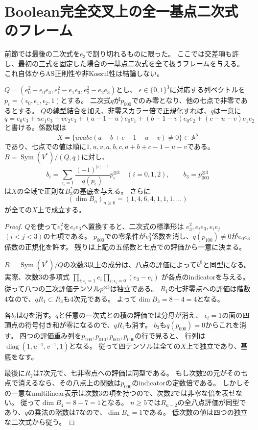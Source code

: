 \section{Boolean完全交叉上の全一基点二次式のフレーム}
\label{sec:boolean-quadric-boundary}
前節では最後の二次式を$e_3$で割り切れるものに限った。
ここでは交差項も許し、最初の三式を固定した場合の一基点二次式を全て扱うフレームを与える。
これ自体からAS正則性や非Koszul性は結論しない。

\begin{proposition}[全一基点開集合での三次評価フレーム]
\label{prop:boolean-global-cubic-frame}
$Q=(e_0^2-e_0e_3,e_1^2-e_1e_3,e_2^2-e_2e_3)$とし、
$\epsilon\in\{0,1\}^3$に対応する列ベクトルを$p_\epsilon=(\epsilon_0,\epsilon_1,\epsilon_2,1)$とする。
二次式$q$が$p_{000}$でのみ零となり、他の七点で非零であるとする。
$Q$の線型結合を加え、非零スカラー倍で正規化すれば、$q$は一意に
\[
 q=e_0e_3+u e_1e_3+v e_2e_3
 +(a-1-u)e_0e_1+(b-1-v)e_0e_2+(c-u-v)e_1e_2
\]
と書ける。係数域は
\[
 X=\{uvabc(a+b+c-1-u-v)\ne0\}\subset\mathbb A^5
\]
であり、七点での値は順に$1,u,v,a,b,c,a+b+c-1-u-v$である。
$B=\operatorname{Sym}(V^*)/(Q,q)$に対し、
\[
 b_i=\sum_{\epsilon_i=1}
       \frac{(-1)^{|\epsilon|-1}}{q(p_\epsilon)}p_\epsilon^{\otimes3}
       \quad(i=0,1,2),\qquad b_3=p_{000}^{\otimes3}
\]
は$X$の全域で正則な$B_3^*$の基底を与える。
さらに
\[
 (\dim B_n)_{n\geq0}=(1,4,6,4,1,1,1,\ldots)
\]
が全ての$X$上で成立する。
\end{proposition}
\begin{proof}
$Q$を使って$e_i^2$を$e_ie_3$へ置換すると、二次式の標準形は
$e_3^2,e_ie_3,e_ie_j$ $(i<j<3)$の七項である。
$p_{000}$での零条件が$e_3^2$係数を消し、$q(p_{100})\ne0$が$e_0e_3$係数の正規化を許す。
残りは上記の五係数と七点での評価から一意に決まる。

$R=\operatorname{Sym}(V^*)/Q$の次数3以上の成分は、八点の評価によって$k^8$と同型になる。
実際、次数3の多項式
$\prod_{i:\epsilon_i=1}e_i\prod_{i:\epsilon_i=0}(e_3-e_i)$
が各点のindicatorを与える。
従って八つの三次評価テンソル$p_\epsilon^{\otimes3}$は独立である。
$R_1$の七非零点への評価は階数4なので、$qR_1\subset R_3$も4次元である。
よって$\dim B_3=8-4=4$となる。

各$b_i$は$Q$を消す。$q$と任意の一次式との積の評価では分母が消え、
$\epsilon_i=1$の面の四頂点の符号付き和が零になるので、$qR_1$も消す。
$b_3$も$q(p_{000})=0$からこれを消す。
四つの評価重み列を$p_{100},p_{010},p_{001},p_{000}$の行で見ると、
行列は$\operatorname{diag}(1,u^{-1},v^{-1},1)$となる。
従って四テンソルは全ての$X$上で独立であり、基底をなす。

最後に$R_2$は7次元で、七非零点への評価は同型である。
もし次数2の元がその七点で消えるなら、その八点上の関数は$p_{000}$のindicatorの定数倍である。
しかしその一意なmultilinear表示は次数3の項を持つので、次数2では非零な倍を表せない。
従って$\dim B_4=8-7=1$となる。
$n\geq5$では$R_{n-2}$の全八点評価が同型であり、$q$の乗法の階数は7なので、$\dim B_n=1$である。
低次数の値は四つの独立な二次式から従う。
\end{proof}


